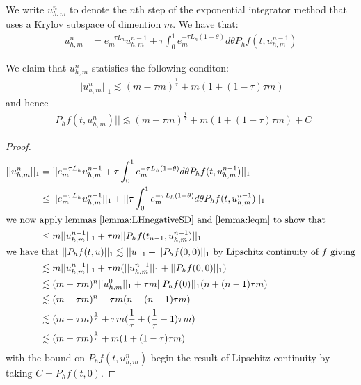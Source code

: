 \begin{definition}
    We write $u_{h,m}^n$ to denote the $n$th step of the exponential integrator method that uses a Krylov subspace of dimention $m$.
    We have that:
    \begin{align*}
        u_{h,m}^n &= e_m^{-\tau L_h} u_{h,m}^{n-1} + \tau \int^1_0e_m^{-\tau L_h(1-\theta)}d\theta P_hf(t, u_{h,m}^{n-1})
    \end{align*}
\end{definition}

\begin{lemma}
    We claim that $u_{h,m}^n$ statisfies the following conditon:
    \begin{align*}
        ||u_{h,m}^n||_1 \lesssim (m-\tau m)^\frac{1}{\tau} + m (1 + (1 - \tau)\tau m)
    \end{align*}
    and hence
    \begin{align*}
        ||P_hf(t,u_{h,m}^n)|| \lesssim (m-\tau m)^\frac{1}{\tau} + m (1 + (1 - \tau)\tau m) + C
    \end{align*}
\end{lemma}
\begin{proof}
    \begin{align*}
        ||u_{h,m}^n||_1 &= ||e_m^{-\tau L_h}u_{h,m}^{n-1} + \tau \int^1_0e_m^{-\tau L_h(1-\theta)}d\theta P_hf(t, u_{h,m}^{n-1})||_1\\
        &\leq ||e_m^{-\tau L_h}u_{h,m}^{n-1}||_1 + ||\tau \int^1_0e_m^{-\tau L_h(1-\theta)}d\theta P_hf(t, u_{h,m}^{n-1})||_1\\
        \intertext{we now apply lemmas \ref{lemma:LHnegativeSD} and \ref{lemma:leqm} to show that}
        &\leq m||u_{h,m}^{n-1}||_1 + \tau m ||P_hf(t_{n-1},u_{h,m}^{n-1})||_1\\
        \intertext{we have that $||P_hf(t,u)||_1 \lesssim ||u||_1+||P_hf(0,0)||_1$ by Lipschitz continuity of $f$ giving}
        &\lesssim m||u_{h,m}^{n-1}||_1 + \tau m (||u_{h,m}^{n-1}||_1 + ||P_hf(0,0)||_1)\\
        &\lesssim (m-\tau m)^n||u_{h,m}^0||_1 + \tau m ||P_hf(0)||_1(n + (n -1)\tau m)\\
        &\lesssim (m-\tau m)^n + \tau m (n + (n -1)\tau m)\\
        &\lesssim (m-\tau m)^\frac{1}{\tau} + \tau m (\frac{1}{\tau} + (\frac{1}{\tau} -1)\tau m)\\
        &\lesssim (m-\tau m)^\frac{1}{\tau} + m (1 + (1 - \tau)\tau m)
    \end{align*}
    with the bound on $P_hf(t,u_{h,m}^n)$ begin the result of Lipschitz continuity by taking $C=P_hf(t,0)$.
\end{proof}

